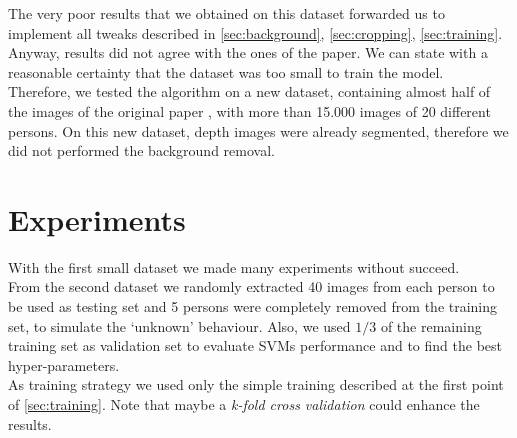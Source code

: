 \documentclass{article}
\begin{document}
The very poor results that we obtained on this dataset forwarded us to
implement all tweaks described in \ref{sec:background}, \ref{sec:cropping},
\ref{sec:training}. Anyway, results did not agree with the ones of the paper.
We can state with a reasonable certainty that the dataset was too small to
train the model.
\\
Therefore, we tested the algorithm on a new dataset, containing almost half of
the images of the original paper \citep{Fanelli2013}, with more than 15.000
images of 20 different persons. On this new dataset, depth images were already
segmented, therefore we did not performed the background removal.

\section{Experiments}
With the first small dataset we made many experiments without succeed.
\\
From the second dataset we randomly extracted 40 images from each person to be
used as testing set and 5 persons were completely removed from the training
set, to simulate the `unknown' behaviour. Also, we used $1/3$ of the remaining
training set as validation set to evaluate SVMs performance and to find the
best hyper-parameters.
\\
As training strategy we used only the simple training described at the first
point of \ref{sec:training}. Note that maybe a \textit{k-fold cross validation}
could enhance the results.
\end{document}
